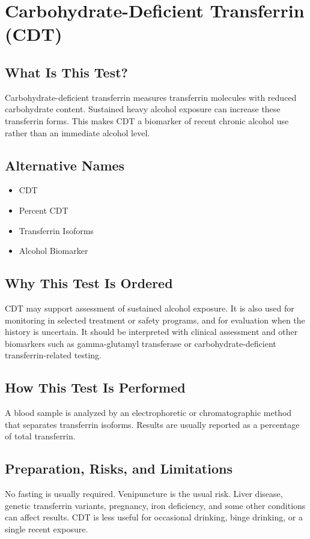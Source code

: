 \chapter{Carbohydrate-Deficient Transferrin (CDT)}

\section*{What Is This Test?}
Carbohydrate-deficient transferrin measures transferrin molecules with reduced carbohydrate content. Sustained heavy alcohol exposure can increase these transferrin forms. This makes CDT a biomarker of recent chronic alcohol use rather than an immediate alcohol level.

\section*{Alternative Names}
\begin{itemize}
  \item CDT
  \item Percent CDT
  \item Transferrin Isoforms
  \item Alcohol Biomarker
\end{itemize}
\section*{Why This Test Is Ordered}
CDT may support assessment of sustained alcohol exposure. It is also used for monitoring in selected treatment or safety programs, and for evaluation when the history is uncertain. It should be interpreted with clinical assessment and other biomarkers such as gamma-glutamyl transferase or carbohydrate-deficient transferrin-related testing.

\section*{How This Test Is Performed}
A blood sample is analyzed by an electrophoretic or chromatographic method that separates transferrin isoforms. Results are usually reported as a percentage of total transferrin.

\section*{Preparation, Risks, and Limitations}
No fasting is usually required. Venipuncture is the usual risk. Liver disease, genetic transferrin variants, pregnancy, iron deficiency, and some other conditions can affect results. CDT is less useful for occasional drinking, binge drinking, or a single recent exposure.

